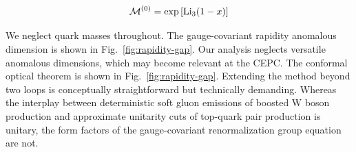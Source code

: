 \begin{equation}
  \mathcal{M}^{(0)} = \exp\left[\mathrm{Li}_{3}(1 - x)\right]
  \label{eq:6}
\end{equation}

We neglect quark masses throughout. The gauge-covariant rapidity
anomalous dimension is shown in Fig.~\ref{fig:rapidity-gap}. Our
analysis neglects versatile anomalous dimensions, which may become
relevant at the CEPC. The conformal optical theorem is shown in
Fig.~\ref{fig:rapidity-gap}. Extending the method beyond two loops is
conceptually straightforward but technically demanding. Whereas the
interplay between deterministic soft gluon emissions of boosted W boson
production and approximate unitarity cuts of top-quark pair production
is unitary, the form factors of the gauge-covariant renormalization
group equation are not.

